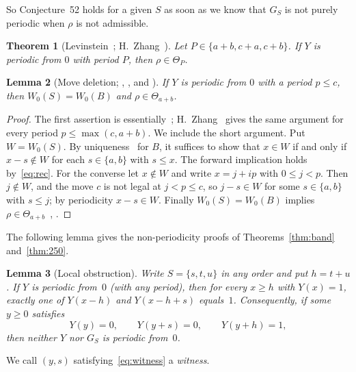 \documentclass[11pt]{amsart}
\newtheorem{theorem}{Theorem}[section]
\newtheorem{lemma}[theorem]{Lemma}
\theoremstyle{definition}
\numberwithin{equation}{section}
\newcommand{\Th}[1]{\Theta_{#1}}
\begin{document}
So Conjecture~52 holds for a given $S$ as soon as we know that $G_S$ is not purely periodic
when $\rho$ is not admissible.

\begin{theorem}[{Levinstein~\cite[Thm.~1.1]{Levinstein}; H.~Zhang~\cite[Thm.~2 and \S4]{HZhang}}]\label{thm:57}
Let $P\in\{a+b,c+a,c+b\}$. If $Y$ is periodic from $0$ with period $P$, then
$\rho\in\Th{P}$.
\end{theorem}

\begin{lemma}[Move deletion; {\cite[Prop.~2.9]{MP}}, {\cite[\S3]{HZhang}}, {\cite[Thm.~1.1(1)]{Levinstein}} and {\cite[Prop.~25]{Manabe}}]\label{lem:deletion}
If $Y$ is periodic from $0$ with a period $p\le c$, then $W_0(S)=W_0(B)$ and
$\rho\in\Th{a+b}$.
\end{lemma}

\begin{proof}
The first assertion is essentially~\cite[Prop.~2.9]{MP}; H.~Zhang~\cite[\S3]{HZhang} gives
the same argument for every period $p\le\max(c,a+b)$. We include the short argument. Put
$W=W_0(S)$. By uniqueness~\cite[Lemma~4]{Manabe} for $B$, it suffices to show that $x\in W$ if and only if $x-s\notin W$ for
each $s\in\{a,b\}$ with $s\le x$. The forward implication holds by~\eqref{eq:rec}. For the
converse let $x\notin W$ and write $x=j+ip$ with $0\le j<p$. Then $j\notin W$, and the move
$c$ is not legal at $j<p\le c$, so $j-s\in W$ for some $s\in\{a,b\}$ with $s\le j$; by
periodicity $x-s\in W$. Finally $W_0(S)=W_0(B)$ implies
$\rho\in\Th{a+b}$~\cite[Prop.~25]{Manabe}, \cite[Thm.~1.1(1)]{Levinstein}.
\end{proof}

The following lemma gives the non-periodicity proofs of Theorems~\ref{thm:band}
and~\ref{thm:250}.

\begin{lemma}[Local obstruction]\label{lem:witness}
Write $S=\{s,t,u\}$ in any order and put $h=t+u$. If $Y$ is periodic from~$0$ (with any
period), then for every $x\ge h$ with $Y(x)=1$, exactly one of $Y(x-h)$ and $Y(x-h+s)$
equals~$1$. Consequently, if some $y\ge0$ satisfies
\begin{equation}\label{eq:witness}
Y(y)=0,\qquad Y(y+s)=0,\qquad Y(y+h)=1,
\end{equation}
then neither $Y$ nor $G_S$ is periodic from~$0$.
\end{lemma}

We call $(y,s)$ satisfying~\eqref{eq:witness} a \emph{witness}.
\end{document}
